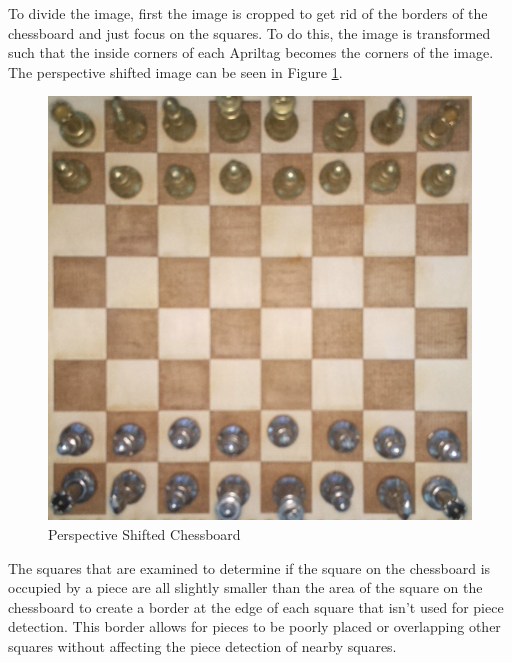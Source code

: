\documentclass[journal]{IEEEtran}
\begin{document}
To divide the image, first the image is cropped to get rid of the borders of the chessboard and just focus on the squares. To do this, the image is transformed such that the inside corners of each Apriltag becomes the corners of the image.
The perspective shifted image can be seen in Figure \ref{InsideCrop}.

\begin{figure}[!ht]
	\centering
	\includegraphics[width=\linewidth]{Images/InputImage_InsideCrop.jpg}
	\caption{Perspective Shifted Chessboard}
	\label{InsideCrop}
\end{figure}

The squares that are examined to determine if the square on the chessboard is occupied by a piece are all slightly smaller than the area of the square on the chessboard to create a border at the edge of each square that isn't used for piece detection. This border allows for pieces to be poorly placed or overlapping other squares without affecting the piece detection of nearby squares.
\end{document}
